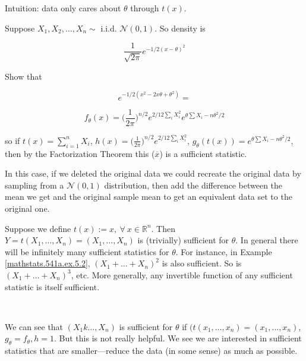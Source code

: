 \begin{remark} Intuition: data only cares about \(\theta\) through \(t(x)\). 

\end{remark}


\begin{exercise} Suppose \(X_1, X_2, \ldots, X_n \sim\) i.i.d. \(\mathcal{N}(0,1)\). So density is 

\[
\frac{1}{\sqrt{2 \pi}} e^{- 1/2(x- \theta)^2} 
\]

Show that 

\[
e^{-1/2(x^2 -2x \theta + \theta^2)} = 
\]

\[
f_\theta(x) = \bigg( \frac{1}{2\pi} \bigg)^{n/2} e^{2/12 \sum_i X_i^2} e^{\theta \sum X_i - n\theta^2/2}
\]

so if \(t(x) = \sum_{i=1}^n X_i\), \(h(x) =  \bigg( \frac{1}{2\pi} \bigg)^{n/2} e^{2/12 \sum_i X_i^2} \), \(g_\theta(t(x)) =  e^{\theta \sum X_i - n\theta^2/2}\), then by the Factorization Theorem this (\(\overline{x}\)) is a sufficient statistic.

\end{exercise}

\begin{remark} In this case, if we deleted the original data we could recreate the original data by sampling from a \(\mathcal{N}(0,1)\) distribution, then add the difference between the mean we get and the original sample mean to get an equivalent data set to the original one.

\end{remark}

\begin{remark} Suppose we define \(t(x):=x, \ \forall \ x \in \mathbb{R}^n\). Then \(Y = t(X_1, \ldots, X_n) = (X_1, \ldots, X_n)\) is (trivially) sufficient for \(\theta\). In general there will be infinitely many sufficient statistics for \(\theta\). For instance, in Example \ref{mathstats.541a.ex.5.2}, \((X_1 + \ldots + X_n)^2\) is also sufficient. So is  \((X_1 + \ldots + X_n)^3\), etc. More generally, any invertible function of any sufficient statistic is itself sufficient.

\

We can see that \((X_1k \ldots, X_n)\) is sufficient for \(\theta\) if \((t(x_1, \ldots, x_n) = (x_1, \ldots, x_n)\), \(g_\theta = f_\theta, h =1\). But this is not really helpful. We see we are interested in sufficient statistics that are smaller---reduce the data (in some sense) as much as possible.

\end{remark}

